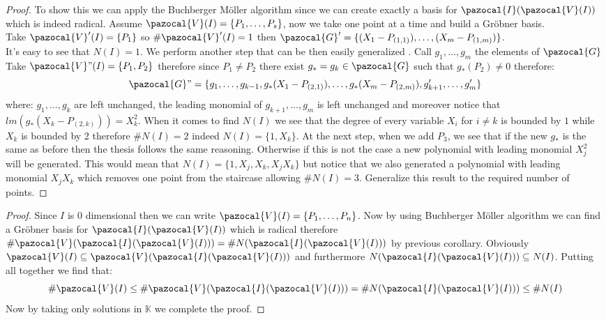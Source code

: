 \documentclass[11pt,a4paper]{report}
\theoremstyle{plain}
\theoremstyle{definition}
\newcommand{\I}{\pazocal{I}}
\newcommand{\V}{\pazocal{V}}
\newcommand{\G}{\pazocal{G}}
\begin{document}
\begin{cor-hand}[3.1.6]
\end{cor-hand}
\begin{proof}
	To show this we can apply the Buchberger M\"oller algorithm since we can create exactly a basis for $\I(\V(I))$ which is indeed radical. Assume $\V(I) = \{P_1,\ldots,P_s\}$, now we take one point at a time and build a Gr\"obner basis.\\
	Take $\V'(I) = \{P_1\}$ so $\#\V'(I) = 1$ then $\G' = \{(X_1 - P_{(1,1)}),\ldots,(X_m - P_{(1,m)})\}$.\\
	It's easy to see that $N(I) = {1}$.
	We perform another step that can be then easily generalized	. Call $g_1,\ldots,g_m$ the elements of $\G$\\
	Take $\V"(I) = \{P_1,P_2\}$ therefore since $P_1 \ne P_2$ there exist $g_* = g_k \in \G$ such that $g_*(P_2) \neq 0$ therefore:
	\[
		\G" = \{g_1,\ldots,g_{k-1},g_*(X_1 - P_{(2,1)}),\ldots,g_*(X_m - P_{(2,m)}),g'_{k+1},\ldots,g'_m\}	
	\]
	where: $g_1,\ldots,g_k$ are left unchanged, the leading monomial of $g_{k+1},\ldots,g_m$ is left unchanged and moreover notice that $lm(g_*(X_k - P_{(2,k)})) = X_k^2$. When it comes to find $N(I)$ we see that the degree of every variable $X_i$ for $i \ne k$ is bounded by $1$ while $X_k$ is bounded by 2 therefore $\#N(I) = 2$ indeed $N(I) = \{1,X_k\}$. At the next step, when we add $P_3$, we see that if the new 	$g_*$ is the same as before then the thesis follows the same reasoning. Otherwise if this is not the case a new polynomial with leading monomial $X_j^2$ will be generated. This would mean that $N(I) = \{1,X_j,X_k,X_jX_k\}$ but notice that we also generated a polynomial with leading monomial $X_jX_k$ which removes one point from the staircase allowing $\#N(I) = 3$. Generalize this result to the required number of points.
\end{proof}
\newpage
\begin{thm-hand}[3.1.7]
\end{thm-hand}
\begin{proof}
	Since $I$ is $0$ dimensional then we can write $\V(I) = \{P_1,\ldots,P_n\}$. Now by using Buchberger M\"oller algorithm we can find a Gr\"obner basis for $\I(\V(I))$ which is radical therefore $\#\V(\I(\V(I))) = \#N(\I(\V(I)))$ by previous corollary. Obviously $\V(I) \subseteq \V(\I(\V(I)))$ and furthermore $N(\I(\V(I))) \subseteq N(I)$. Putting all together we find that:
	\[
			\#\V(I) \le \#\V(\I(\V(I))) = \#N(\I(\V(I))) \le \#N(I)
	\]
	Now by taking only solutions in $\mathbb{K}$ we complete the proof.
\end{proof}
\end{document}

